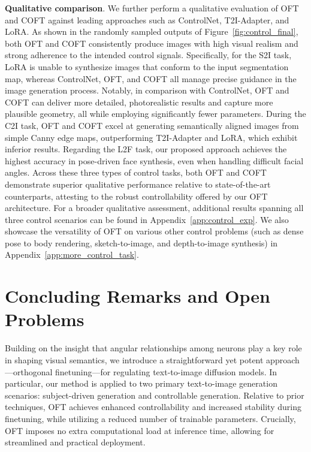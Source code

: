 \textbf{Qualitative comparison}. We further perform a qualitative evaluation of OFT and COFT against leading approaches such as ControlNet, T2I-Adapter, and LoRA. As shown in the randomly sampled outputs of Figure~\ref{fig:control_final}, both OFT and COFT consistently produce images with high visual realism and strong adherence to the intended control signals. Specifically, for the S2I task, LoRA is unable to synthesize images that conform to the input segmentation map, whereas ControlNet, OFT, and COFT all manage precise guidance in the image generation process. Notably, in comparison with ControlNet, OFT and COFT can deliver more detailed, photorealistic results and capture more plausible geometry, all while employing significantly fewer parameters. During the C2I task, OFT and COFT excel at generating semantically aligned images from simple Canny edge maps, outperforming T2I-Adapter and LoRA, which exhibit inferior results. Regarding the L2F task, our proposed approach achieves the highest accuracy in pose-driven face synthesis, even when handling difficult facial angles. Across these three types of control tasks, both OFT and COFT demonstrate superior qualitative performance relative to state-of-the-art counterparts, attesting to the robust controllability offered by our OFT architecture. For a broader qualitative assessment, additional results spanning all three control scenarios can be found in Appendix~\ref{app:control_exp}. We also showcase the versatility of OFT on various other control problems (such as dense pose to body rendering, sketch-to-image, and depth-to-image synthesis) in Appendix~\ref{app:more_control_task}.

\section{Concluding Remarks and Open Problems}

Building on the insight that angular relationships among neurons play a key role in shaping visual semantics, we introduce a straightforward yet potent approach—orthogonal finetuning—for regulating text-to-image diffusion models. In particular, our method is applied to two primary text-to-image generation scenarios: subject-driven generation and controllable generation. Relative to prior techniques, OFT achieves enhanced controllability and increased stability during finetuning, while utilizing a reduced number of trainable parameters. Crucially, OFT imposes no extra computational load at inference time, allowing for streamlined and practical deployment.

